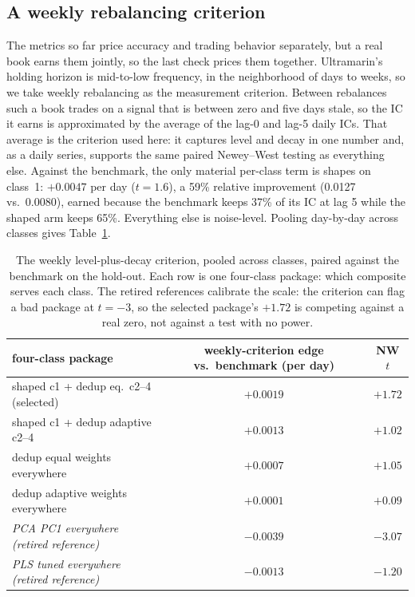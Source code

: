 \documentclass[11pt]{article}
\begin{document}
\subsection{A weekly rebalancing criterion}
\label{sec:referee-combo}

The metrics so far price accuracy and trading behavior separately, but a real book earns
them jointly, so the last check prices them together. Ultramarin's holding horizon is
mid-to-low frequency, in the neighborhood of days to weeks, so we take weekly
rebalancing as the measurement criterion. Between rebalances such a book trades on a
signal that is between zero and five days stale, so the IC it earns is approximated by
the average of the lag-0 and lag-5 daily ICs. That average is the criterion used here:
it captures level and decay in one number and, as a daily series, supports the same
paired Newey--West testing as everything else. Against the benchmark, the only material per-class term is shapes on
class~1: $+0.0047$ per day ($t=1.6$), a 59\% relative improvement (0.0127 vs.\ 0.0080),
earned because the benchmark keeps 37\% of its IC at lag 5 while the shaped arm keeps
65\%. Everything else is noise-level. Pooling day-by-day across classes gives
Table~\ref{tab:combo}.

\begin{table}[!htbp]
\centering
\small
\caption{The weekly level-plus-decay criterion, pooled across classes, paired against the
benchmark on the hold-out. Each row is one four-class package: which composite serves
each class. The retired references calibrate the scale: the criterion can flag a bad
package at $t=-3$, so the selected package's $+1.72$ is competing against a real zero,
not against a test with no power.}
\label{tab:combo}
\begin{tabular}{lcc}
\toprule
four-class package & weekly-criterion edge vs.\ benchmark (per day) & NW $t$ \\
\midrule
shaped c1 + dedup eq.\ c2--4 (selected) & $+0.0019$ & $+1.72$ \\
shaped c1 + dedup adaptive c2--4 & $+0.0013$ & $+1.02$ \\
dedup equal weights everywhere & $+0.0007$ & $+1.05$ \\
dedup adaptive weights everywhere & $+0.0001$ & $+0.09$ \\
\emph{PCA PC1 everywhere (retired reference)} & $-0.0039$ & $-3.07$ \\
\emph{PLS tuned everywhere (retired reference)} & $-0.0013$ & $-1.20$ \\
\bottomrule
\end{tabular}
\end{table}
\end{document}

